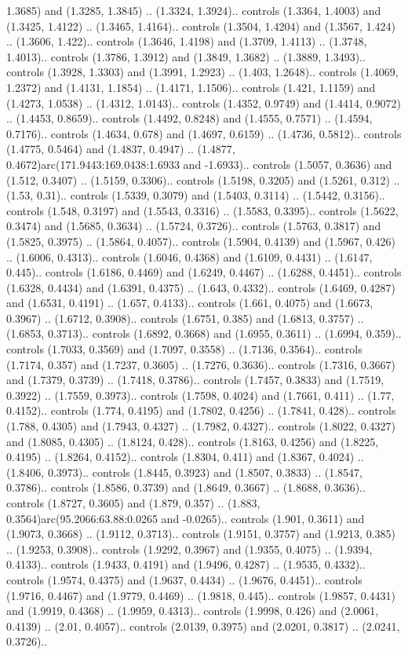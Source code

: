 1.3685) and (1.3285, 1.3845) .. (1.3324, 1.3924).. controls (1.3364, 1.4003) and (1.3425, 1.4122) .. (1.3465, 1.4164).. controls (1.3504, 1.4204) and (1.3567, 1.424) .. (1.3606, 1.422).. controls (1.3646, 1.4198) and (1.3709, 1.4113) .. (1.3748, 1.4013).. controls (1.3786, 1.3912) and (1.3849, 1.3682) .. (1.3889, 1.3493).. controls (1.3928, 1.3303) and (1.3991, 1.2923) .. (1.403, 1.2648).. controls (1.4069, 1.2372) and (1.4131, 1.1854) .. (1.4171, 1.1506).. controls (1.421, 1.1159) and (1.4273, 1.0538) .. (1.4312, 1.0143).. controls (1.4352, 0.9749) and (1.4414, 0.9072) .. (1.4453, 0.8659).. controls (1.4492, 0.8248) and (1.4555, 0.7571) .. (1.4594, 0.7176).. controls (1.4634, 0.678) and (1.4697, 0.6159) .. (1.4736, 0.5812).. controls (1.4775, 0.5464) and (1.4837, 0.4947) .. (1.4877, 0.4672)arc(171.9443:169.0438:1.6933 and -1.6933).. controls (1.5057, 0.3636) and (1.512, 0.3407) .. (1.5159, 0.3306).. controls (1.5198, 0.3205) and (1.5261, 0.312) .. (1.53, 0.31).. controls (1.5339, 0.3079) and (1.5403, 0.3114) .. (1.5442, 0.3156).. controls (1.548, 0.3197) and (1.5543, 0.3316) .. (1.5583, 0.3395).. controls (1.5622, 0.3474) and (1.5685, 0.3634) .. (1.5724, 0.3726).. controls (1.5763, 0.3817) and (1.5825, 0.3975) .. (1.5864, 0.4057).. controls (1.5904, 0.4139) and (1.5967, 0.426) .. (1.6006, 0.4313).. controls (1.6046, 0.4368) and (1.6109, 0.4431) .. (1.6147, 0.445).. controls (1.6186, 0.4469) and (1.6249, 0.4467) .. (1.6288, 0.4451).. controls (1.6328, 0.4434) and (1.6391, 0.4375) .. (1.643, 0.4332).. controls (1.6469, 0.4287) and (1.6531, 0.4191) .. (1.657, 0.4133).. controls (1.661, 0.4075) and (1.6673, 0.3967) .. (1.6712, 0.3908).. controls (1.6751, 0.385) and (1.6813, 0.3757) .. (1.6853, 0.3713).. controls (1.6892, 0.3668) and (1.6955, 0.3611) .. (1.6994, 0.359).. controls (1.7033, 0.3569) and (1.7097, 0.3558) .. (1.7136, 0.3564).. controls (1.7174, 0.357) and (1.7237, 0.3605) .. (1.7276, 0.3636).. controls (1.7316, 0.3667) and (1.7379, 0.3739) .. (1.7418, 0.3786).. controls (1.7457, 0.3833) and (1.7519, 0.3922) .. (1.7559, 0.3973).. controls (1.7598, 0.4024) and (1.7661, 0.411) .. (1.77, 0.4152).. controls (1.774, 0.4195) and (1.7802, 0.4256) .. (1.7841, 0.428).. controls (1.788, 0.4305) and (1.7943, 0.4327) .. (1.7982, 0.4327).. controls (1.8022, 0.4327) and (1.8085, 0.4305) .. (1.8124, 0.428).. controls (1.8163, 0.4256) and (1.8225, 0.4195) .. (1.8264, 0.4152).. controls (1.8304, 0.411) and (1.8367, 0.4024) .. (1.8406, 0.3973).. controls (1.8445, 0.3923) and (1.8507, 0.3833) .. (1.8547, 0.3786).. controls (1.8586, 0.3739) and (1.8649, 0.3667) .. (1.8688, 0.3636).. controls (1.8727, 0.3605) and (1.879, 0.357) .. (1.883, 0.3564)arc(95.2066:63.88:0.0265 and -0.0265).. controls (1.901, 0.3611) and (1.9073, 0.3668) .. (1.9112, 0.3713).. controls (1.9151, 0.3757) and (1.9213, 0.385) .. (1.9253, 0.3908).. controls (1.9292, 0.3967) and (1.9355, 0.4075) .. (1.9394, 0.4133).. controls (1.9433, 0.4191) and (1.9496, 0.4287) .. (1.9535, 0.4332).. controls (1.9574, 0.4375) and (1.9637, 0.4434) .. (1.9676, 0.4451).. controls (1.9716, 0.4467) and (1.9779, 0.4469) .. (1.9818, 0.445).. controls (1.9857, 0.4431) and (1.9919, 0.4368) .. (1.9959, 0.4313).. controls (1.9998, 0.426) and (2.0061, 0.4139) .. (2.01, 0.4057).. controls (2.0139, 0.3975) and (2.0201, 0.3817) .. (2.0241, 0.3726).. 